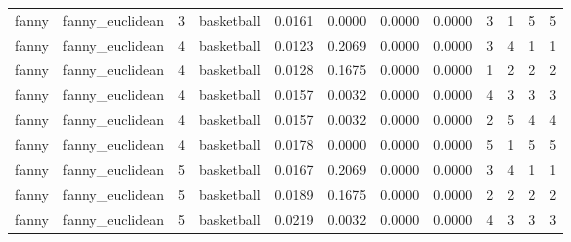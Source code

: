 \documentclass[
]{article}
\begin{document}
\begin{longtable}{| p{1.1cm} | p{2cm} | p{0.8cm} | p{1.3cm} | p{0.60cm} | p{0.7cm} | p{0.65cm} | p{0.65cm} | p{0.65cm} | p{0.65cm} | p{0.7cm} | p{0.65cm} |}
\scriptsize   fanny   & \scriptsize  fanny\_euclidean & \scriptsize    3    & \scriptsize basketball & \scriptsize    0.0161  &  \scriptsize 0.0000 & \scriptsize 0.0000 & \scriptsize    0.0000 & \scriptsize   3  & \scriptsize    1  & \scriptsize    5  & \scriptsize    5 \\
\cline{3-12}
\scriptsize   fanny   & \scriptsize  fanny\_euclidean & \scriptsize    4    & \scriptsize basketball & \scriptsize    0.0123  &  \scriptsize 0.2069 & \scriptsize 0.0000 & \scriptsize    0.0000 & \scriptsize   3  & \scriptsize    4  & \scriptsize    1  & \scriptsize    1 \\
\scriptsize   fanny   & \scriptsize  fanny\_euclidean & \scriptsize    4    & \scriptsize basketball & \scriptsize    0.0128  &  \scriptsize 0.1675 & \scriptsize 0.0000 & \scriptsize    0.0000 & \scriptsize   1  & \scriptsize    2  & \scriptsize    2  & \scriptsize    2 \\
\scriptsize   fanny   & \scriptsize  fanny\_euclidean & \scriptsize    4    & \scriptsize basketball & \scriptsize    0.0157  &  \scriptsize 0.0032 & \scriptsize 0.0000 & \scriptsize    0.0000 & \scriptsize   4  & \scriptsize    3  & \scriptsize    3  & \scriptsize    3 \\
\scriptsize   fanny   & \scriptsize  fanny\_euclidean & \scriptsize    4    & \scriptsize basketball & \scriptsize    0.0157  &  \scriptsize 0.0032 & \scriptsize 0.0000 & \scriptsize    0.0000 & \scriptsize   2  & \scriptsize    5  & \scriptsize    4  & \scriptsize    4 \\
\scriptsize   fanny   & \scriptsize  fanny\_euclidean & \scriptsize    4    & \scriptsize basketball & \scriptsize    0.0178  &  \scriptsize 0.0000 & \scriptsize 0.0000 & \scriptsize    0.0000 & \scriptsize   5  & \scriptsize    1  & \scriptsize    5  & \scriptsize    5 \\
\cline{3-12}
\scriptsize   fanny   & \scriptsize  fanny\_euclidean & \scriptsize    5    & \scriptsize basketball & \scriptsize    0.0167  &  \scriptsize 0.2069 & \scriptsize 0.0000 & \scriptsize    0.0000 & \scriptsize   3  & \scriptsize    4  & \scriptsize    1  & \scriptsize    1 \\
\scriptsize   fanny   & \scriptsize  fanny\_euclidean & \scriptsize    5    & \scriptsize basketball & \scriptsize    0.0189  &  \scriptsize 0.1675 & \scriptsize 0.0000 & \scriptsize    0.0000 & \scriptsize   2  & \scriptsize    2  & \scriptsize    2  & \scriptsize    2 \\
\scriptsize   fanny   & \scriptsize  fanny\_euclidean & \scriptsize    5    & \scriptsize basketball & \scriptsize    0.0219  &  \scriptsize 0.0032 & \scriptsize 0.0000 & \scriptsize    0.0000 & \scriptsize   4  & \scriptsize    3  & \scriptsize    3  & \scriptsize    3 \\

\end{longtable}
\end{document}
